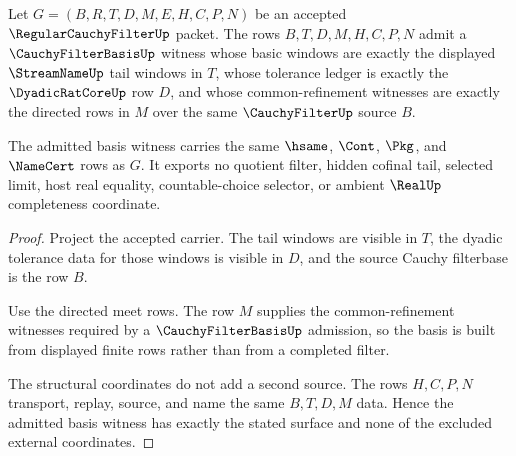 \begin{theorem}
\label{thm:regular-cauchy-filter-basis-witness-admission}
Let $G=(B,R,T,D,M,E,H,C,P,N)$ be an accepted $\RegularCauchyFilterUp$ packet. The rows $B,T,D,M,H,C,P,N$ admit a $\CauchyFilterBasisUp$ witness whose basic windows are exactly the displayed $\StreamNameUp$ tail windows in $T$, whose tolerance ledger is exactly the $\DyadicRatCoreUp$ row $D$, and whose common-refinement witnesses are exactly the directed rows in $M$ over the same $\CauchyFilterUp$ source $B$.

The admitted basis witness carries the same $\hsame$, $\Cont$, $\Pkg$, and $\NameCert$ rows as $G$. It exports no quotient filter, hidden cofinal tail, selected limit, host real equality, countable-choice selector, or ambient $\RealUp$ completeness coordinate.
\end{theorem}
\begin{proof}
Project the accepted carrier. The tail windows are visible in $T$, the dyadic tolerance data for those windows is visible in $D$, and the source Cauchy filterbase is the row $B$.

Use the directed meet rows. The row $M$ supplies the common-refinement witnesses required by a $\CauchyFilterBasisUp$ admission, so the basis is built from displayed finite rows rather than from a completed filter.

The structural coordinates do not add a second source. The rows $H,C,P,N$ transport, replay, source, and name the same $B,T,D,M$ data. Hence the admitted basis witness has exactly the stated surface and none of the excluded external coordinates.
\end{proof}

